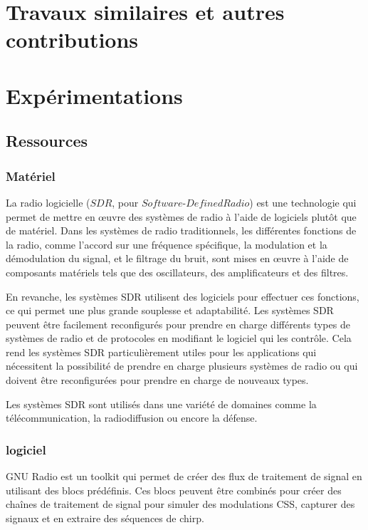 \documentclass[12pt,a4paper,oneside, titlepage]{report}
\begin{document}
\chapter{Travaux similaires et autres contributions}


\newpage

\chapter{Expérimentations}

\section{Ressources}

\subsection{Matériel}

La radio logicielle ($SDR$, pour $Software$-$Defined Radio$) est une technologie qui permet de mettre en œuvre des systèmes de radio à l'aide de logiciels plutôt que de matériel. Dans les systèmes de radio traditionnels, les différentes fonctions de la radio, comme l'accord sur une fréquence spécifique, la modulation et la démodulation du signal, et le filtrage du bruit, sont mises en œuvre à l'aide de composants matériels tels que des oscillateurs, des amplificateurs et des filtres.

En revanche, les systèmes SDR utilisent des logiciels pour effectuer ces fonctions, ce qui permet une plus grande souplesse et adaptabilité. Les systèmes SDR peuvent être facilement reconfigurés pour prendre en charge différents types de systèmes de radio et de protocoles en modifiant le logiciel qui les contrôle. Cela rend les systèmes SDR particulièrement utiles pour les applications qui nécessitent la possibilité de prendre en charge plusieurs systèmes de radio ou qui doivent être reconfigurées pour prendre en charge de nouveaux types.

Les systèmes SDR sont utilisés dans une variété de domaines comme  la télécommunication, la radiodiffusion ou encore la défense.


\subsection{logiciel}

GNU Radio est un toolkit qui permet de créer des flux de traitement de signal en utilisant des blocs prédéfinis. Ces blocs peuvent être combinés pour créer des chaînes de traitement de signal pour simuler des modulations CSS, capturer des signaux et en extraire des séquences de chirp.
\end{document}
